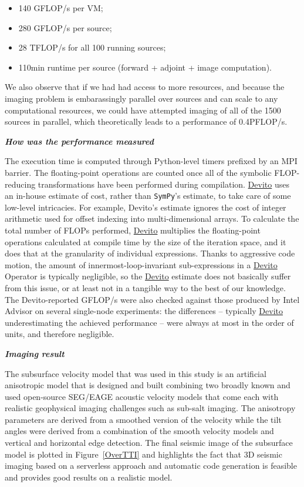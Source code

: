 \documentclass[conference]{IEEEtran}
\begin{document}
\begin{itemize}
\itemsep1pt\parskip0pt
\item
  140 GFLOP/s per VM;
\item
  280 GFLOP/s per source;
\item
  28 TFLOP/s for all 100 running sources;
\item
  110min runtime per source (forward + adjoint + image computation).
\end{itemize}

We also observe that if we had had access to more resources, and because
the imaging problem is embarassingly parallel over sources and can scale
to any computational resources, we could have attempted imaging of all
of the 1500 sources in parallel, which theoretically leads to a
performance of 0.4PFLOP/s.

\textbf{\emph{How was the performance measured}}

The execution time is computed through Python-level timers prefixed by
an MPI barrier. The floating-point operations are counted once all of
the symbolic FLOP-reducing transformations have been performed during
compilation. \href{https://github.com/devitocodes/devito}{Devito} uses
an in-house estimate of cost, rather than \texttt{SymPy}'s estimate, to
take care of some low-level intricacies. For example, Devito's estimate
ignores the cost of integer arithmetic used for offset indexing into
multi-dimensional arrays. To calculate the total number of FLOPs
performed, \href{https://github.com/devitocodes/devito}{Devito}
multiplies the floating-point operations calculated at compile time by
the size of the iteration space, and it does that at the granularity of
individual expressions. Thanks to aggressive code motion, the amount of
innermost-loop-invariant sub-expressions in a
\href{https://github.com/devitocodes/devito}{Devito} Operator is
typically negligible, so the
\href{https://github.com/devitocodes/devito}{Devito} estimate does not
basically suffer from this issue, or at least not in a tangible way to
the best of our knowledge. The Devito-reported GFLOP/s were also checked
against those produced by Intel Advisor on several single-node
experiments: the differences -- typically
\href{https://github.com/devitocodes/devito}{Devito} underestimating the
achieved performance -- were always at most in the order of units, and
therefore negligible.

\textbf{\emph{Imaging result}}

The subsurface velocity model that was used in this study is an
artificial anisotropic model that is designed and built combining two
broadly known and used open-source SEG/EAGE acoustic velocity models
that come each with realistic geophysical imaging challenges such as
sub-salt imaging. The anisotropy parameters are derived from a smoothed
version of the velocity while the tilt angles were derived from a
combination of the smooth velocity models and vertical and horizontal
edge detection. The final seismic image of the subsurface model is
plotted in Figure~\ref{OverTTI} and highlights the fact that 3D seismic
imaging based on a serverless approach and automatic code generation is
feasible and provides good results on a realistic model.
\end{document}
